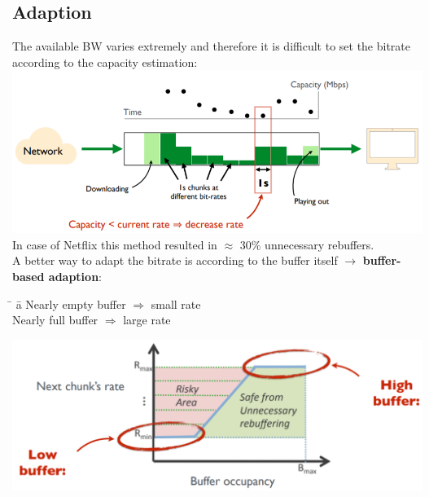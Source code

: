 \documentclass[a4paper, fontsize=8pt, landscape, DIV=1]{scrartcl}
\begin{document}
\begin{multicols*}{4}
		\subsection{Adaption}
		The available BW varies extremely and therefore it is difficult to set the bitrate according to the capacity estimation:\\
		\includegraphics[width=\columnwidth]{images/Application_Layer/adaption_capacity.png}
		In case of Netflix this method resulted in $\approx$ 30\% unnecessary rebuffers.\\
		A better way to adapt the bitrate is according to the buffer itself $\rightarrow$ \textbf{buffer-based adaption}:
		\begin{tabbing}
			\hspace{3cm} \= \hspace{1cm} \=  a \kill
			Nearly empty buffer \> $\Rightarrow$ \> small rate \\
			Nearly full buffer \> $\Rightarrow$ \> large rate
		\end{tabbing}
		\includegraphics[width=\columnwidth]{images/Application_Layer/buffer_adaption.png}
		 
		
		
		\end{multicols*}
	\setcounter{secnumdepth}{3}
\end{document}
